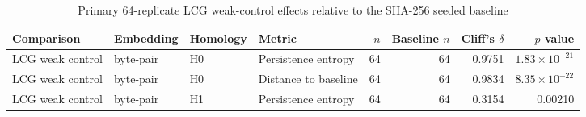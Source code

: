 
\begin{table}[htbp]
\centering
\caption{Primary 64-replicate LCG weak-control effects relative to the SHA-256 seeded baseline}
\label{tab:primary-lcg-effects}
\begin{adjustbox}{max width=\textwidth}
\begin{tabular}{llllrrrr}
\toprule
Comparison & Embedding & Homology & Metric & $n$ & Baseline $n$ & Cliff's $\delta$ & $p$ value \\
\midrule
LCG weak control & byte-pair & H0 & Persistence entropy & 64 & 64 & 0.9751 & $1.83 \times 10^{-21}$ \\
LCG weak control & byte-pair & H0 & Distance to baseline & 64 & 64 & 0.9834 & $8.35 \times 10^{-22}$ \\
LCG weak control & byte-pair & H1 & Persistence entropy & 64 & 64 & 0.3154 & 0.00210 \\
\bottomrule
\end{tabular}
\end{adjustbox}
\end{table}
